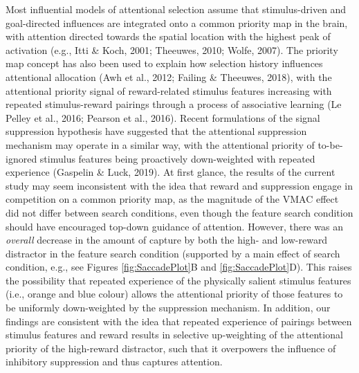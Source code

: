 \documentclass[man, a4paper, noextraspace, 11pt,floatsintext]{apa6}
\theoremstyle{definition}
\theoremstyle{definition}
\theoremstyle{definition}
\theoremstyle{remark}
\begin{document}
Most influential models of attentional selection assume that
stimulus-driven and goal-directed influences are integrated onto a
common priority map in the brain, with attention directed towards the
spatial location with the highest peak of activation (e.g., Itti \&
Koch, 2001; Theeuwes, 2010; Wolfe, 2007). The priority map concept has
also been used to explain how selection history influences attentional
allocation (Awh et al., 2012; Failing \& Theeuwes, 2018), with the
attentional priority signal of reward-related stimulus features
increasing with repeated stimulus-reward pairings through a process of
associative learning (Le Pelley et al., 2016; Pearson et al., 2016).
Recent formulations of the signal suppression hypothesis have suggested
that the attentional suppression mechanism may operate in a similar way,
with the attentional priority of to-be-ignored stimulus features being
proactively down-weighted with repeated experience (Gaspelin \& Luck,
2019). At first glance, the results of the current study may seem
inconsistent with the idea that reward and suppression engage in
competition on a common priority map, as the magnitude of the VMAC
effect did not differ between search conditions, even though the feature
search condition should have encouraged top-down guidance of attention.
However, there was an \emph{overall} decrease in the amount of capture
by both the high- and low-reward distractor in the feature search
condition (supported by a main effect of search condition, e.g., see
Figures \ref{fig:SaccadePlot}B and \ref{fig:SaccadePlot}D). This raises
the possibility that repeated experience of the physically salient
stimulus features (i.e., orange and blue colour) allows the attentional
priority of those features to be uniformly down-weighted by the
suppression mechanism. In addition, our findings are consistent with the
idea that repeated experience of pairings between stimulus features and
reward results in selective up-weighting of the attentional priority of
the high-reward distractor, such that it overpowers the influence of
inhibitory suppression and thus captures attention.
\end{document}
